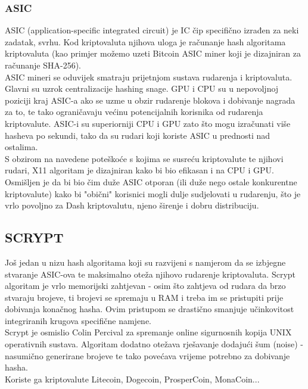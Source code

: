 \documentclass[12pt]{article}
\begin{document}
\subsubsection{ASIC}
ASIC (application-specific integrated circuit) je IC čip specifično izrađen za neki zadatak, svrhu. Kod kriptovaluta njihova uloga je računanje hash algoritama kriptovaluta (kao primjer možemo uzeti Bitcoin ASIC miner koji je dizajniran za računanje SHA-256). \\
ASIC mineri se oduvijek smatraju prijetnjom sustava rudarenja i kriptovaluta. Glavni su uzrok centralizacije hashing snage. GPU i CPU su u nepovoljnoj poziciji kraj ASIC-a ako se uzme u obzir rudarenje blokova i dobivanje nagrada za to, te tako ograničavaju većinu potencijalnih korisnika od rudarenja kriptovalute. 
ASIC-i su superiorniji CPU i GPU zato što mogu izračunati više hasheva po sekundi, tako da su rudari koji koriste ASIC u prednosti nad ostalima.\cite{asic}\\
S obzirom na navedene poteškoće s kojima se susreću kriptovalute te njihovi rudari, X11 algoritam je dizajniran kako bi bio efikasan i na CPU i GPU. Osmišljen je da bi bio čim duže ASIC otporan (ili duže nego ostale konkurentne kriptovalute) kako bi "obični" korisnici mogli dulje sudjelovati u rudarenju, što je vrlo povoljno za Dash kriptovalutu, njeno širenje i dobru distribuciju. \\  



\subsection{SCRYPT}
Još jedan u nizu hash algoritama koji su razvijeni s namjerom  da se izbjegne stvaranje ASIC-ova te maksimalno oteža njihovo rudarenje kriptovaluta. Scrypt algoritam je vrlo memorijski zahtjevan - osim što zahtjeva od rudara da brzo stvaraju brojeve, ti brojevi se spremaju u RAM i treba im se pristupiti prije dobivanja konačnog hasha. Ovim pristupom se drastično smanjuje učinkovitost integriranih krugova specifične namjene.\\
Scrypt je osmislio Colin Percival za spremanje online sigurnosnih kopija UNIX operativnih sustava. Algoritam dodatno otežava rješavanje dodajući šum (noise) - nasumično generirane brojeve te tako povećava vrijeme potrebno za dobivanje hasha. \\
Koriste ga kriptovalute Litecoin, Dogecoin, ProsperCoin, MonaCoin...\\
\end{document}
